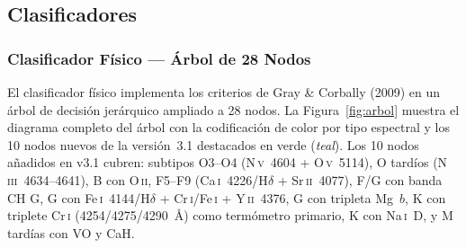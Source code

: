 \documentclass[12pt,a4paper]{article}
\begin{document}
\subsection{Clasificadores}

\subsubsection{Clasificador Físico — Árbol de 28 Nodos}

El clasificador físico implementa los criterios de Gray \& Corbally (2009) en un árbol
de decisión jerárquico ampliado a 28 nodos.
La Figura~\ref{fig:arbol} muestra el diagrama completo del árbol con la codificación
de color por tipo espectral y los 10 nodos nuevos de la versión~3.1 destacados en verde
(\textit{teal}). Los 10 nodos añadidos en v3.1 cubren:
subtipos O3--O4 (N\,\textsc{v}~4604 + O\,\textsc{v}~5114), O tardíos
(N\,\textsc{iii}~4634--4641), B con O\,\textsc{ii}, F5--F9 (Ca\,\textsc{i}~4226/H$\delta$
+ Sr\,\textsc{ii}~4077), F/G con banda CH G, G con Fe\,\textsc{i}~4144/H$\delta$ +
Cr\,\textsc{i}/Fe\,\textsc{i} + Y\,\textsc{ii}~4376, G con tripleta Mg~$b$, K con
triplete Cr\,\textsc{i} (4254/4275/4290~Å) como termómetro primario, K con
Na\,\textsc{i}~D, y M tardías con VO y CaH.
\end{document}
